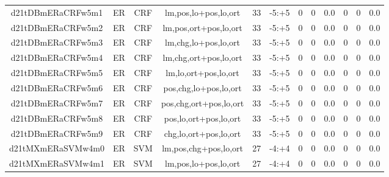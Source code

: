 \documentclass[a4paper]{article}
\begin{document}
\begin{landscape}
\begin{center}
\begin{tabular}{ |c|c|c|c|c|c|c|c|c|c|c|c|}
 
 	
 	\small{ d21tDBmERaCRFw5m1 } & ER & CRF & lm,pos,lo+pos,lo,ort  &  33 &  -5:+5  &  0 & 0 & 0.0  &  0 & 0 & 0.0 \\
 	

 
 	
 	\small{ d21tDBmERaCRFw5m2 } & ER & CRF & lm,pos,ort+pos,lo,ort  &  33 &  -5:+5  &  0 & 0 & 0.0  &  0 & 0 & 0.0 \\
 	

 
 	
 	\small{ d21tDBmERaCRFw5m3 } & ER & CRF & lm,chg,lo+pos,lo,ort  &  33 &  -5:+5  &  0 & 0 & 0.0  &  0 & 0 & 0.0 \\
 	

 
 	
 	\small{ d21tDBmERaCRFw5m4 } & ER & CRF & lm,chg,ort+pos,lo,ort  &  33 &  -5:+5  &  0 & 0 & 0.0  &  0 & 0 & 0.0 \\
 	

 
 	
 	\small{ d21tDBmERaCRFw5m5 } & ER & CRF & lm,lo,ort+pos,lo,ort  &  33 &  -5:+5  &  0 & 0 & 0.0  &  0 & 0 & 0.0 \\
 	

 
 	
 	\small{ d21tDBmERaCRFw5m6 } & ER & CRF & pos,chg,lo+pos,lo,ort  &  33 &  -5:+5  &  0 & 0 & 0.0  &  0 & 0 & 0.0 \\
 	

 
 	
 	\small{ d21tDBmERaCRFw5m7 } & ER & CRF & pos,chg,ort+pos,lo,ort  &  33 &  -5:+5  &  0 & 0 & 0.0  &  0 & 0 & 0.0 \\
 	

 
 	
 	\small{ d21tDBmERaCRFw5m8 } & ER & CRF & pos,lo,ort+pos,lo,ort  &  33 &  -5:+5  &  0 & 0 & 0.0  &  0 & 0 & 0.0 \\
 	

 
 	
 	\small{ d21tDBmERaCRFw5m9 } & ER & CRF & chg,lo,ort+pos,lo,ort  &  33 &  -5:+5  &  0 & 0 & 0.0  &  0 & 0 & 0.0 \\
 	

 
 	
 	\small{ d21tMXmERaSVMw4m0 } & ER & SVM & lm,pos,chg+pos,lo,ort  &  27 &  -4:+4  &  0 & 0 & 0.0  &  0 & 0 & 0.0 \\
 	

 
 	
 	\small{ d21tMXmERaSVMw4m1 } & ER & SVM & lm,pos,lo+pos,lo,ort  &  27 &  -4:+4  &  0 & 0 & 0.0  &  0 & 0 & 0.0 \\
 	


\end{tabular}
\end{center}
\end{landscape}
\end{document}
